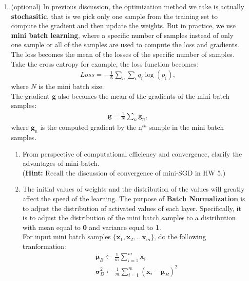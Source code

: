 \documentclass[11pt,letter,notitlepage]{article}
\begin{document}
\begin{exercise}
\begin{enumerate}
\end{enumerate}
\begin{enumerate}[resume]
    \item (optional) In previous discussion, the optimization method we take is actually \textbf{stochasitic}, that is we pick only one sample from the training set to compute the gradient and then update the weights. But in practice, we use \textbf{mini batch learning}, where a specific number of samples instead of only one sample or all of the samples are used to compute the loss and gradients. The loss becomes the mean of the losses of the specific number of samples. Take the cross entropy for example, the loss function becomes:
    \begin{align*}
    Loss = -\frac{1}{N}\sum_n \sum_i q_i\log (p_i),
    \end{align*}
    where $N$ is the mini batch size.\\
    The gradient $\mathbf{g}$ also becomes the mean of the gradients of the mini-batch samples:
    \begin{align*}
    \mathbf{g} = \frac{1}{N}\sum_n \mathbf{g}_n,
    \end{align*}
    where $\mathbf{g}_n$ is the computed gradient by the n$^{th}$ sample in the mini batch samples. \\
    \begin{enumerate}
        \item From perspective of computational efficiency and convergence, clarify the advantages of mini-batch.\\
        (\textbf{Hint:} Recall the discussion of convergence of mini-SGD in HW 5.)
        \item The initial values of weights and the distribution of the values will 
        greatly affect the speed of the learning. The purpose of \textbf{Batch Normalization} is to adjust the distribution of activated values of each layer. Specifically, it is to adjust the distribution of the mini batch samples to a distribution with mean equal to \textbf{0} and variance equal to \textbf{1}. \\
        For input mini batch samples $\{\mathbf{x}_1, \mathbf{x}_2, ... \mathbf{x}_m\}$, do the following tranformation:
        \begin{align*}
        &\mathbf{\mu}_B \leftarrow \frac{1}{m}\sum_{i=1}^{m} \mathbf{x}_i\\
        &\mathbf{\sigma}_B^2 \leftarrow \frac{1}{m}\sum_{i=1}^{m} (\mathbf{x}_i - \mathbf{\mu}_B)^2 \\

\end{align*}
\end{enumerate}
\end{enumerate}
\end{exercise}
\end{document}
